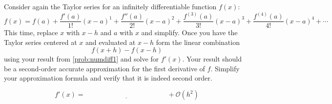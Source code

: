 \begin{problem}\label{prob:numdiff3}
    Consider again the Taylor series for an infinitely differentiable function $f(x)$:
    \[ f(x) = f(a) + \frac{f'(a)}{1!} (x-a)^1 + \frac{f''(a)}{2!}(x-a)^2 +
        \frac{f^{(3)}(a)}{3!}(x-a)^3 + \frac{f^{(4)}(a)}{4!}(x-a)^4 + \cdots \] 
    This time, replace $x$ with $x-h$ and $a$ with $x$ and simplify.  Once you have the
    Taylor series centered at $x$ and evaluated at $x-h$ form the linear combination
    \[ f(x+h) - f(x-h) \]
    using your result from \ref{prob:numdiff1} and solve for $f'(x)$.  Your result should
    be a second-order accurate approximation for the first derivative of $f$.  Simplify
    your approximation formula and verify that it is indeed second order.
\end{problem}

\begin{thm}
    \[ f'(x) = \underline{\hspace{2in}} + \mathcal{O}(h^2) \]
\end{thm}

